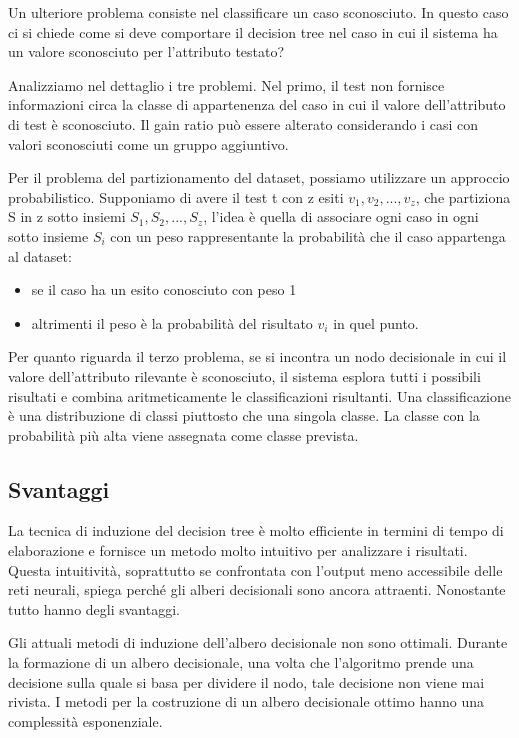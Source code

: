 \documentclass[a4paper]{extarticle}
\begin{document}
Un ulteriore problema consiste nel classificare un caso sconosciuto. In questo caso ci si chiede come si deve comportare il decision tree nel caso in cui il sistema ha un valore sconosciuto per l'attributo testato?

Analizziamo nel dettaglio i tre problemi. Nel primo, il test non fornisce informazioni circa la classe di appartenenza del caso in cui il valore dell'attributo di test è sconosciuto. Il gain ratio può essere alterato considerando i casi con valori sconosciuti come un gruppo aggiuntivo.

Per il problema del partizionamento del dataset, possiamo utilizzare un approccio probabilistico. Supponiamo di avere il test t con z esiti $v_1,v_2,...,v_z$, che partiziona S in z sotto insiemi $S_1,S_2,...,S_z$, l'idea è quella di associare ogni caso in ogni sotto insieme $S_i$ con un peso rappresentante la probabilità che il caso appartenga al dataset:

\begin{itemize}
\item se il caso ha un esito conosciuto con peso 1
\item altrimenti il peso è la probabilità del risultato $v_i$ in quel punto.
\end{itemize}

Per quanto riguarda il terzo problema, se si incontra un nodo decisionale in cui il valore dell'attributo rilevante è sconosciuto, il sistema esplora tutti i possibili risultati e combina aritmeticamente le classificazioni risultanti. Una classificazione è una distribuzione di classi piuttosto che una singola classe. La classe con la probabilità più alta viene assegnata come classe prevista.

\subsection{Svantaggi}

La tecnica di induzione del decision tree è molto efficiente in termini di tempo di elaborazione e fornisce un metodo molto intuitivo per analizzare i risultati. Questa intuitività, soprattutto se confrontata con l'output meno accessibile delle reti neurali, spiega perché gli alberi decisionali sono ancora attraenti. Nonostante tutto hanno degli svantaggi.

Gli attuali metodi di induzione dell'albero decisionale non sono ottimali. Durante la formazione di un albero decisionale, una volta che l'algoritmo prende una decisione sulla quale si basa per dividere il nodo, tale decisione non viene mai rivista. I metodi per la costruzione di un albero decisionale ottimo hanno una complessità esponenziale.
\end{document}
